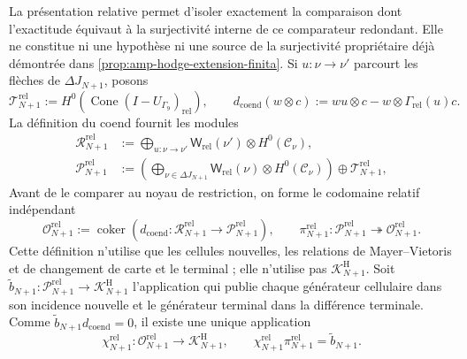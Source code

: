 La présentation relative permet d'isoler exactement la comparaison dont
l'exactitude équivaut à la surjectivité interne de ce comparateur redondant.
Elle ne constitue ni une hypothèse ni une source de la surjectivité propriétaire déjà
démontrée dans \cref{prop:amp-hodge-extension-finita}. Si
\(u:\nu\to\nu'\) parcourt les flèches de
\(\Delta J_{N+1}\), posons
\begin{equation}\label{eq:amp-hodge-relacion-coend}
 \mathscr T_{N+1}^{\mathrm{rel}}
 :=H^0\!\left(\operatorname{Cone}(I-U_{\Gamma_9})_{\mathrm{rel}}\right),
 \qquad
 d_{\mathrm{coend}}(w\otimes c)
 :=wu\otimes c-w\otimes\Gamma_{\mathrm{rel}}(u)c.
\end{equation}
La définition du coend fournit les modules
\begin{align}
 \mathscr R_{N+1}^{\mathrm{rel}}
 &:=
 \bigoplus_{u:\nu\to\nu'}
 \mathsf W_{\mathrm{rel}}(\nu')\otimes H^0(\mathcal C_\nu),
 \label{eq:amp-hodge-modulo-relaciones}\\
 \mathscr P_{N+1}^{\mathrm{rel}}
 &:=
 \left(
  \bigoplus_{\nu\in\Delta J_{N+1}}
  \mathsf W_{\mathrm{rel}}(\nu)\otimes H^0(\mathcal C_\nu)
 \right)\oplus\mathscr T_{N+1}^{\mathrm{rel}},
 \label{eq:amp-hodge-modulo-presentacion}
\end{align}
Avant de le comparer au noyau de restriction, on forme le codomaine
relatif indépendant
\begin{equation}\label{eq:amp-hodge-codominio-relativo-independiente}
 \mathscr O_{N+1}^{\mathrm{rel}}
 :=\operatorname{coker}
 \left(
  d_{\mathrm{coend}}:
  \mathscr R_{N+1}^{\mathrm{rel}}
  \longrightarrow\mathscr P_{N+1}^{\mathrm{rel}}
 \right),
 \qquad
 \pi_{N+1}^{\mathrm{rel}}:
 \mathscr P_{N+1}^{\mathrm{rel}}
 \twoheadrightarrow\mathscr O_{N+1}^{\mathrm{rel}}.
\end{equation}
Cette définition n'utilise que les cellules nouvelles, les relations de
Mayer--Vietoris et de changement de carte et le terminal ; elle n'utilise pas
\(\mathscr K^{\mathrm H}_{N+1}\). Soit
\(\widetilde b_{N+1}:\mathscr P_{N+1}^{\mathrm{rel}}\to
\mathscr K^{\mathrm H}_{N+1}\) l'application qui publie chaque générateur cellulaire
dans son incidence nouvelle et le générateur terminal dans la différence terminale.
Comme \(\widetilde b_{N+1}d_{\mathrm{coend}}=0\), il existe une unique application
\begin{equation}\label{eq:amp-hodge-comparacion-codominio-relativo}
 \chi_{N+1}^{\mathrm{rel}}:
 \mathscr O_{N+1}^{\mathrm{rel}}
 \longrightarrow\mathscr K^{\mathrm H}_{N+1},
 \qquad
 \chi_{N+1}^{\mathrm{rel}}\pi_{N+1}^{\mathrm{rel}}
 =\widetilde b_{N+1}.
\end{equation}

